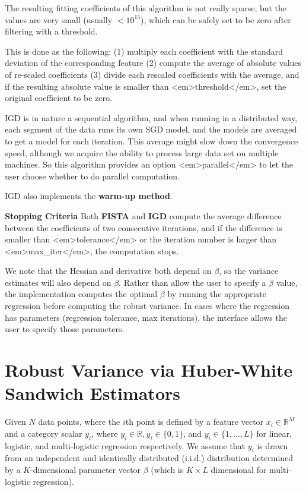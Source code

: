 The resulting fitting coefficients of this algorithm is not really sparse, but
the values are very small (usually $< 10^{15}$), which can be safely set to be
zero after filtering with a threshold.

This is done as the following: (1) multiply each coefficient with the standard
deviation of the corresponding feature (2) compute the average of absolute
values of re-scaled coefficients (3) divide each rescaled coefficients with the
average, and if the resulting absolute value is smaller than <em>threshold</em>,
set the original coefficient to be zero.

IGD is in nature a sequential algorithm, and when running in a distributed way,
each segment of the data runs its own SGD model, and the models are averaged to
get a model for each iteration. This average might slow down the convergence
speed, although we acquire the ability to process large data set on multiple
machines. So this algorithm provides an option <em>parallel</em> to let the user
choose whether to do parallel computation.

IGD also implements the {\bf warm-up method}.

{\bf Stopping Criteria} Both {\bf FISTA} and {\bf IGD} compute the average
difference between the coefficients of two consecutive iterations, and if the
difference is smaller than <em>tolerance</em> or the iteration number is larger
than <em>max\_iter</em>, the computation stops.


We note that the Hessian and derivative both depend on $\beta$, so the variance estimates will also depend on $\beta$.  Rather than allow the user to specify a $\beta$ value, the implementation computes the optimal $\beta$ by running the appropriate regression  before computing the robust variance.  In cases where the regression has parameters (regression tolerance, max iterations), the interface allows the user to specify those parameters.


\section{Robust Variance via Huber-White Sandwich Estimators}
Given  $N$ data points, where the $i$th point is defined by a feature  vector $x_i \in \mathbb{R}^M$ and a category scalar $y_i$, where $y_i \in \mathbb{R}, y_i \in \{0,1 \}$, and $y_i \in \{1,\dots, L \}$ for linear, logistic, and multi-logistic regression respectively.  We assume that $y_i$ is drawn from an independent and identically distributed (i.i.d.) distribution determined by a $K$-dimensional parameter vector $\beta$ (which is $K\times L$ dimensional for multi-logistic regression).

